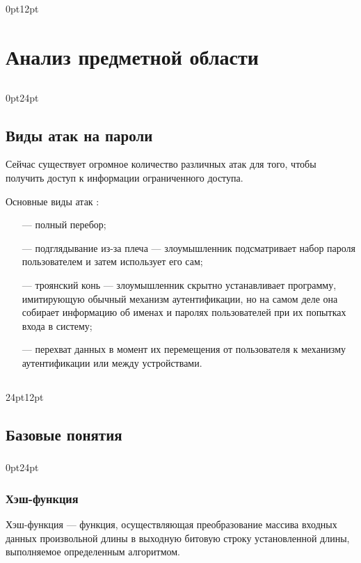 \titlespacing\section{\parindent}{0pt}{12pt}
\section{Анализ предметной области}
\titlespacing\subsection{\parindent}{0pt}{24pt}
\subsection{Виды атак на пароли}

Сейчас существует огромное количество различных атак для того, чтобы получить доступ к информации ограниченного доступа.

Основные виды атак \cite{bib3}:
\begin{itemize}
    \item [---] полный перебор;
    \item [---] подглядывание из-за плеча --- злоумышленник подсматривает набор пароля пользователем и затем использует его сам;
    \item [---] троянский конь --- злоумышленник скрытно устанавливает программу, имитирующую обычный механизм аутентификации, но на самом деле она собирает информацию об именах и паролях пользователей при их попытках входа в систему;
    \item [---] перехват данных в момент их перемещения от пользователя к механизму аутентификации или между устройствами.
 \end{itemize}

\titlespacing\subsection{\parindent}{24pt}{12pt}
\subsection{Базовые понятия}
\titlespacing\subsubsection{\parindent}{0pt}{24pt}
\subsubsection{Хэш-функция}
Хэш-функция \cite{bib4} ---  функция, осуществляющая преобразование массива входных данных произвольной длины в выходную битовую строку установленной длины, выполняемое определенным алгоритмом.

